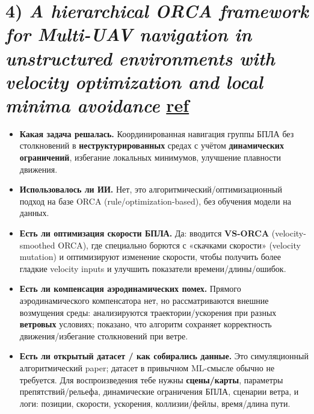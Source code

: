 \section*{4) \textit{A hierarchical ORCA framework for Multi-UAV navigation in unstructured environments with velocity optimization and local minima avoidance} \href{https://www.sciencedirect.com/science/article/pii/S0957417425028210}{ref}}
\begin{itemize}
  \item \textbf{Какая задача решалась.}
  Координированная навигация группы БПЛА без столкновений в \textbf{неструктурированных} средах с учётом \textbf{динамических ограничений}, избегание локальных минимумов, улучшение плавности движения.

  \item \textbf{Использовалось ли ИИ.}
  Нет, это алгоритмический/оптимизационный подход на базе ORCA (rule/optimization-based), без обучения модели на данных.

  \item \textbf{Есть ли оптимизация скорости БПЛА.}
  Да: вводится \textbf{VS-ORCA} (velocity-smoothed ORCA), где специально борются с «скачками скорости» (velocity mutation) и оптимизируют изменение скорости, чтобы получить более гладкие velocity inputs и улучшить показатели времени/длины/ошибок.

  \item \textbf{Есть ли компенсация аэродинамических помех.}
  Прямого аэродинамического компенсатора нет, но рассматриваются внешние возмущения среды: анализируются траектории/ускорения при разных \textbf{ветровых} условиях; показано, что алгоритм сохраняет корректность движения/избегание столкновений при ветре.

  \item \textbf{Есть ли открытый датасет / как собирались данные.}
  Это симуляционный алгоритмический paper; датасет в привычном ML-смысле обычно не требуется.
  Для воспроизведения тебе нужны \textbf{сцены/карты}, параметры препятствий/рельефа, динамические ограничения БПЛА, сценарии ветра, и логи: позиции, скорости, ускорения, коллизии/фейлы, время/длина пути.
\end{itemize}

